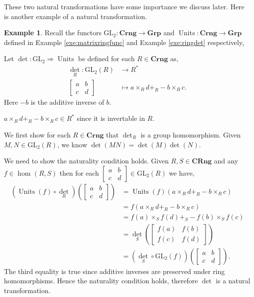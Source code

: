 \documentclass[11pt,a4paper]{article}
\theoremstyle{definition}
\newtheorem{example}[thm]{Example}
\newcommand\ho[3][]{\hom_{#1}(#2,#3)}
\newcommand\func[3]{\mathrm{#1}\colon#2\rightarrow#3}
\newcommand\nattran[3]{#1\colon#2\Rightarrow#3}
\newcommand{\GL}{\mathrm{GL}_{2}}
\DeclareMathOperator{\Units}{Units}
\numberwithin{equation}{section}
\begin{document}
These two natural transformations have some importance we discuss later. Here is another example of a natural transformation.
\begin{example}
\label{exe:detnattran} 
Recall the functors $\func{\GL}{\mathbf{Crng}}{\mathbf{Grp}}$ and $\func{\Units}{\mathbf{Crng}}{\mathbf{Grp}}$ defined in Example \ref{exe:matrixringfunc} and Example \ref{exe:ringdet} respectively, 

Let $\nattran{\det}{\GL}{\Units}$ be defined for each $R\in\mathbf{Crng}$ as,
\begin{align*}
    \det_R\colon \GL(R) &\to R^*\\
    \begin{bmatrix}
        a&b\\
        c&d
    \end{bmatrix}&\mapsto a\times_{R}d+_{R}-b\times_{R}c.
\end{align*}
Here $-b$ is the additive inverse of $b$. 

$a\times_{R}d+_{R}-b\times_{R}c \in R^*$ since it is invertable in $R$.

We first show for each $R\in\mathbf{Crng}$ that $\det_R$ is a group homomorphism.
Given $M,N\in\GL(R)$, we know $\det(MN)= \det(M)\det(N)$.


We need to show the naturality condition holds.
Given $R,S\in\mathbf{CRng}$ and any $f\in\ho{R}{S}$ then for each $\begin{bmatrix}
    a&b\\
    c&d
\end{bmatrix}\in \GL(R)$ we have,
\begin{align*}
    (\Units(f)\circ \det_R)\left(\begin{bmatrix}
    a&b\\
    c&d
\end{bmatrix}\right) &= \Units(f)(a\times_{R}d+_{R}-b\times_{R}c)\\
    &=f(a\times_{R}d+_{R}-b\times_{R}c)\\
    &=f(a)\times_{S}f(d)+_{S}-f(b)\times_{S}f(c)\\ 
    &=\det_S\left(\begin{bmatrix}
    f(a)&f(b)\\
    f(c)&f(d)
\end{bmatrix}\right)\\
    &= (\det_S \circ \GL(f))(\begin{bmatrix}
    a&b\\
    c&d
\end{bmatrix}).
\end{align*}
The third equality is true since additive inverses are preserved under ring homomorphisms.
Hence the naturality condition holds, therefore $\det$ is a natural transformation.
\end{example}
\end{document}
